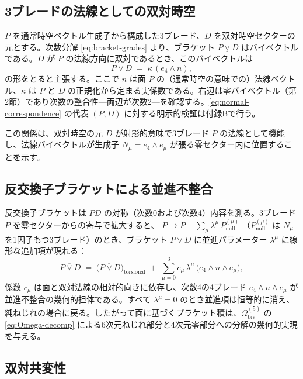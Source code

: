 \documentclass[11pt,a4paper]{article}
\begin{document}
\subsection{3ブレードの法線としての双対時空}

$P$ を通常時空ベクトル生成子から構成した3ブレード、$D$ を双対時空セクターの元とする。次数分解 \eqref{eq:bracket-grades} より、ブラケット $P\mathbin{\underline{\vee}}D$ はバイベクトルである。$D$ が $P$ の法線方向に双対であるとき、このバイベクトルは
\begin{equation}
P \mathbin{\underline{\vee}} D \;=\; \kappa \, (e_{4}\wedge n),
\label{eq:normal-correspondence}
\end{equation}
の形をとると主張する。ここで $n$ は面 $P$ の（通常時空の意味での）法線ベクトル、$\kappa$ は $P$ と $D$ の正規化から定まる実係数である。右辺は零バイベクトル（第2節）であり次数の整合性---両辺が次数2---を確認する。\eqref{eq:normal-correspondence} の代表 $(P,D)$ に対する明示的検証は付録Bで行う。

この関係は、双対時空の元 $D$ が射影的意味で3ブレード $P$ の法線として機能し、法線バイベクトルが生成子 $N_{\mu}=e_{4}\wedge e_{\mu}$ が張る零セクター内に位置することを示す。

\subsection{反交換子ブラケットによる並進不整合}

反交換子ブラケットは $PD$ の対称（次数0および次数4）内容を測る。3ブレード $P$ を零セクターからの寄与で拡大すると、
$P\to P+\sum_{\mu}\lambda^{\mu}\,P^{(\mu)}_{\text{null}}$
（$P^{(\mu)}_{\text{null}}$ は $N_{\mu}$ を1因子もつ3ブレード）のとき、ブラケット $P\mathbin{\overline{\vee}}D$ に並進パラメーター $\lambda^{\mu}$ に線形な追加項が現れる：
\begin{equation}
P\mathbin{\overline{\vee}}D \;=\; \bigl(P\mathbin{\overline{\vee}}D\bigr)_{\text{torsional}}
\;+\;\sum_{\mu=0}^{3} c_{\mu}\,\lambda^{\mu}\,\bigl(e_{4}\wedge n\wedge e_{\mu}\bigr),
\label{eq:bracket-translational}
\end{equation}
係数 $c_{\mu}$ は面と双対法線の相対的向きに依存し、次数4の4ブレード $e_{4}\wedge n\wedge e_{\mu}$ が並進不整合の幾何的担体である。すべて $\lambda^{\mu}=0$ のとき並進項は恒等的に消え、純ねじれの場合に戻る。したがって面に基づくブラケット積は、$\Omega_{\text{biv}}^{(5)}$ の \eqref{eq:Omega-decomp} による6次元ねじれ部分と4次元零部分への分解の幾何的実現を与える。

\subsection{双対共変性}
\end{document}
